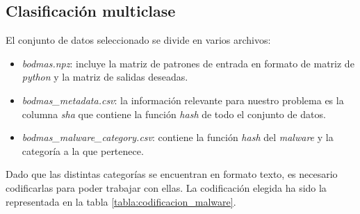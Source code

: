 \subsection{Clasificación multiclase}
\label{subsec:multiclass}

El conjunto de datos seleccionado se divide en varios archivos:

\begin{itemize}
	\item \textit{bodmas.npz}: incluye la matriz de patrones de entrada en formato de matriz de \textit{python} y la matriz de salidas deseadas.
	\item \textit{bodmas\_metadata.csv}: la información relevante para nuestro problema es la columna \textit{sha} que contiene la función \textit{hash} de todo el conjunto de datos.
	\item \textit{bodmas\_malware\_category.csv}: contiene la función \textit{hash} del \textit{malware} y la categoría a la que pertenece.
\end{itemize}

Dado que las distintas categorías se encuentran en formato texto, es necesario codificarlas para poder trabajar con ellas. La codificación elegida ha sido la representada en la tabla \ref{tabla:codificacion_malware}.

\vspace{1em}

